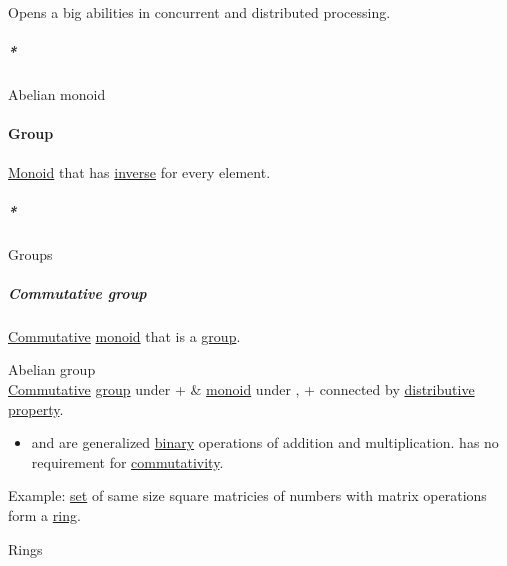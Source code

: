 \documentclass[a4paper,14pt,oneside]{book}
\begin{document}
{Opens a big abilities in concurrent and distributed processing.\\

\subparagraph{\emph{*}}
\label{sec:org31d4297}

\label{orgafd4570}Abelian monoid\\

\paragraph{\label{orgb3cfb9c}Group}
\label{sec:org2da7462}
\hyperref[orgcf84af2]{Monoid} that has \hyperref[org5ab3e3c]{inverse} for every element.\\

\subparagraph{\emph{*}}
\label{sec:org1cc575b}

\label{org70d86d2}Groups\\

\subparagraph{\label{orga1720f7}Commutative group}
\label{sec:orgfb487f9}
\hyperref[orga3bd9ea]{Commutative} \hyperref[orgcf84af2]{monoid} that is a \hyperref[orgb3cfb9c]{group}.\\

\subsubparagraph{\emph{*}}
\label{sec:org4ad2b4d}

\label{orgb16a80d}Abelian group\\

\label{sec:org03fbe51}
\hyperref[orga3bd9ea]{Commutative} \hyperref[orgb3cfb9c]{group} under + \& \hyperref[orgcf84af2]{monoid} under \texttimes{}, + \texttimes{} connected by \hyperref[orgd678e5f]{distributive} \hyperref[org2731790]{property}.\\

\begin{itemize}
\item and \texttimes{} are generalized \hyperref[orge428263]{binary} operations of addition and multiplication. \texttimes{} has no requirement for \hyperref[org72d6f03]{commutativity}.\\
\end{itemize}

Example: \hyperref[org0726f94]{set} of same size square matricies of numbers with matrix operations form a \hyperref[org65c48ee]{ring}.\\

\subsubsubparagraph{\emph{*}}
\label{sec:orga4d5a31}

\label{org465bd2d}Rings\\

}
\end{document}
